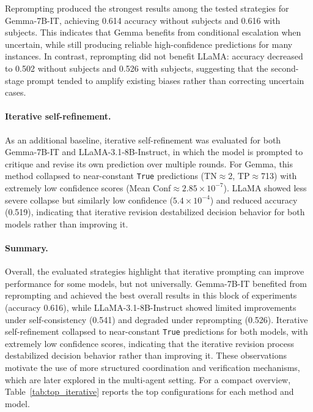 Reprompting produced the strongest results among the tested strategies for Gemma-7B-IT, achieving 0.614 accuracy without subjects and 0.616 with subjects. This indicates that Gemma benefits from conditional escalation when uncertain, while still producing reliable high-confidence predictions for many instances. In contrast, reprompting did not benefit LLaMA: accuracy decreased to 0.502 without subjects and 0.526 with subjects, suggesting that the second-stage prompt tended to amplify existing biases rather than correcting uncertain cases.

\paragraph{Iterative self-refinement.}
As an additional baseline, iterative self-refinement was evaluated for both Gemma-7B-IT and LLaMA-3.1-8B-Instruct, in which the model is prompted to critique and revise its own prediction over multiple rounds. For Gemma, this method collapsed to near-constant \texttt{True} predictions (TN$\approx$2, TP$\approx$713) with extremely low confidence scores (Mean Conf$\approx 2.85 \times 10^{-7}$). LLaMA showed less severe collapse but similarly low confidence ($5.4 \times 10^{-4}$) and reduced accuracy (0.519), indicating that iterative revision destabilized decision behavior for both models rather than improving it.

\paragraph{Summary.}
Overall, the evaluated strategies highlight that iterative prompting can improve performance for some models, but not universally. Gemma-7B-IT benefited from reprompting and achieved the best overall results in this block of experiments (accuracy 0.616), while LLaMA-3.1-8B-Instruct showed limited improvements under self-consistency (0.541) and degraded under reprompting (0.526). Iterative 
self-refinement collapsed to near-constant \texttt{True} predictions for both models, with extremely low confidence scores, indicating that the iterative revision process destabilized decision behavior rather than improving it. These observations motivate the use of more structured coordination and verification mechanisms, which are later explored in the multi-agent setting. For a compact overview, Table~\ref{tab:top_iterative} reports the top configurations for each method and model.

